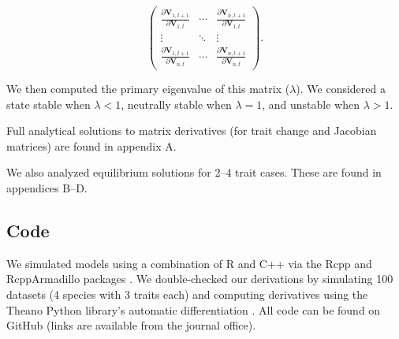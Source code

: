 \begin{equation} \label{eq:jacobian}
    \begin{pmatrix}
        \frac{\partial \mathbf{V}_{1,t+1}}{\partial \mathbf{V}_{1,t}} & \cdots &
            \frac{\partial \mathbf{V}_{n,t+1}}{\partial \mathbf{V}_{1,t}} \\
        \vdots & \ddots & \vdots \\
        \frac{\partial \mathbf{V}_{1,t+1}}{\partial \mathbf{V}_{n,t}} & \cdots &
            \frac{\partial \mathbf{V}_{n,t+1}}{\partial \mathbf{V}_{n,t}}
    \end{pmatrix}
    \textrm{.}
\end{equation}

\noindent We then computed the primary eigenvalue of this matrix ($\lambda$).
We considered a state stable when $\lambda < 1$,
neutrally stable when $\lambda = 1$,
and unstable when $\lambda > 1$.

Full analytical solutions to matrix derivatives (for trait change and
Jacobian matrices) are found in appendix A.

We also analyzed equilibrium solutions for 2--4 trait cases.
These are found in appendices B--D.


\subsection*{Code}

We simulated models using a combination of R \citep{RCoreTeam:2019wf} and
C++ via the Rcpp and RcppArmadillo packages
\citep{Eddelbuettel:2014ad,Eddelbuettel:2013if,Sanderson:2016cs}.
We double-checked our derivations by simulating 100 datasets
(4 species with 3 traits each) and computing derivatives using the Theano Python
library's automatic differentiation \citep{TheanoDevelopmentTeam:2016uc}.
All code can be found on GitHub
(links are available from the journal office).

